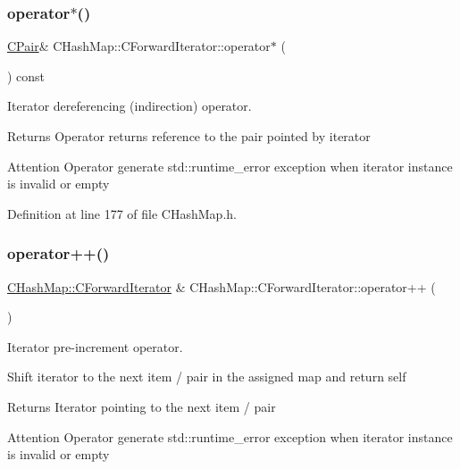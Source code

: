 \subsubsection{\texorpdfstring{operator$\ast$()}{operator*()}}
{\footnotesize\ttfamily \hyperlink{class_c_pair}{C\+Pair}\& C\+Hash\+Map\+::\+C\+Forward\+Iterator\+::operator$\ast$ (\begin{DoxyParamCaption}{ }\end{DoxyParamCaption}) const\hspace{0.3cm}{\ttfamily [inline]}}



Iterator dereferencing (indirection) operator. 

\begin{DoxyReturn}{Returns}
Operator returns reference to the pair pointed by iterator 
\end{DoxyReturn}
\begin{DoxyAttention}{Attention}
Operator generate {\ttfamily std\+::runtime\+\_\+error} exception when iterator instance is invalid or empty 
\end{DoxyAttention}


Definition at line 177 of file C\+Hash\+Map.\+h.

\mbox{\label{class_c_hash_map_1_1_c_forward_iterator_a91997b9621fd4f421b349a2395100184}} 
\subsubsection{\texorpdfstring{operator++()}{operator++()}}
{\footnotesize\ttfamily \hyperlink{class_c_hash_map_1_1_c_forward_iterator}{C\+Hash\+Map\+::\+C\+Forward\+Iterator} \& C\+Hash\+Map\+::\+C\+Forward\+Iterator\+::operator++ (\begin{DoxyParamCaption}{ }\end{DoxyParamCaption})}



Iterator pre-\/increment operator. 

Shift iterator to the next item / pair in the assigned map and return self \begin{DoxyReturn}{Returns}
Iterator pointing to the next item / pair 
\end{DoxyReturn}
\begin{DoxyAttention}{Attention}
Operator generate {\ttfamily std\+::runtime\+\_\+error} exception when iterator instance is invalid or empty 
\end{DoxyAttention}


